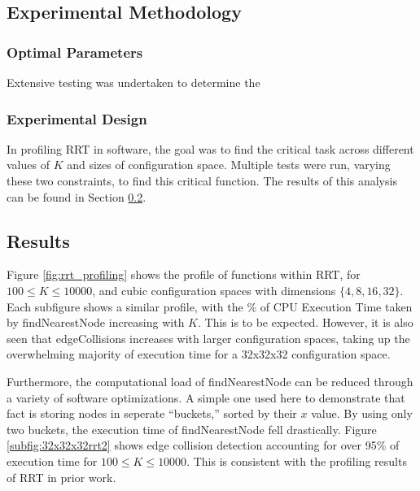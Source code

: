 
        

\subsection{Experimental Methodology}


    \subsubsection{Optimal Parameters}
        Extensive testing was undertaken to determine the 


    \subsubsection*{Experimental Design}
        In profiling \gls{RRT} in software, the goal was to find the critical task across different values of $K$ and sizes of \gls{configuration} space. Multiple tests were run, varying these two constraints, to find this critical function. The results of this analysis can be found in Section \ref{section:rrt_analysis_results}.

\subsection{Results}
\label{section:rrt_analysis_results}
    Figure \ref{fig:rrt_profiling} shows the profile of functions within \gls{RRT}, for $100 \leq K \leq 10000$, and cubic \gls{configuration} spaces with dimensions $\{4, 8, 16, 32\}$. Each subfigure shows a similar profile, with the \% of CPU Execution Time taken by findNearestNode increasing with $K$. This is to be expected. However, it is also seen that edgeCollisions increases with larger \gls{configuration} spaces, taking up the overwhelming majority of execution time for a 32x32x32 \gls{configuration} space.
    
    \newpage
    

    Furthermore, the computational load of findNearestNode can be reduced through a variety of software optimizations. A simple one used here to demonstrate that fact is storing nodes in seperate ``buckets,'' sorted by their $x$ value. By using only two buckets, the execution time of findNearestNode fell drastically. Figure \ref{subfig:32x32x32rrt2} shows edge collision detection accounting for over 95\% of execution time for $100 \leq K \leq 10000$. This is consistent with the profiling results of \gls{RRT} in prior work\cite{Bialkowski2011}.

